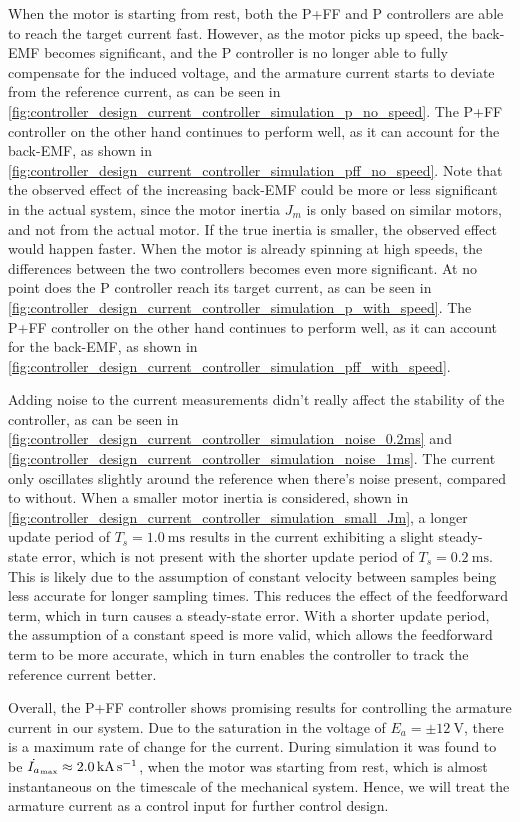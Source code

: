 When the motor is starting from rest, both the P+FF and P controllers are able to reach the target current fast. However, as the motor picks up speed, the back-EMF becomes significant, and the P controller is no longer able to fully compensate for the induced voltage, and the armature current starts to deviate from the reference current, as can be seen in \cref{fig:controller_design_current_controller_simulation_p_no_speed}. The P+FF controller on the other hand continues to perform well, as it can account for the back-EMF, as shown in \cref{fig:controller_design_current_controller_simulation_pff_no_speed}. Note that the observed effect of the increasing back-EMF could be more or less significant in the actual system, since the motor inertia $J_m$ is only based on similar motors, and not from the actual motor. If the true inertia is smaller, the observed effect would happen faster. When the motor is already spinning at high speeds, the differences between the two controllers becomes even more significant. At no point does the P controller reach its target current, as can be seen in \cref{fig:controller_design_current_controller_simulation_p_with_speed}. The P+FF controller on the other hand continues to perform well, as it can account for the back-EMF, as shown in \cref{fig:controller_design_current_controller_simulation_pff_with_speed}.

Adding noise to the current measurements didn't really affect the stability of the controller, as can be seen in \cref{fig:controller_design_current_controller_simulation_noise_0.2ms} and \cref{fig:controller_design_current_controller_simulation_noise_1ms}. The current only oscillates slightly around the reference when there's noise present, compared to without. When a smaller motor inertia is considered, shown in \cref{fig:controller_design_current_controller_simulation_small_Jm}, a longer update period of $T_s = \SI{1.0}{\milli\second}$ results in the current exhibiting a slight steady-state error, which is not present with the shorter update period of $T_s = \SI{0.2}{\milli\second}$. This is likely due to the assumption of constant velocity between samples being less accurate for longer sampling times. This reduces the effect of the feedforward term, which in turn causes a steady-state error. With a shorter update period, the assumption of a constant speed is more valid, which allows the feedforward term to be more accurate, which in turn enables the controller to track the reference current better. 

Overall, the P+FF controller shows promising results for controlling the armature current in our system. Due to the saturation in the voltage of $E_a=\pm\SI{12}{\volt}$, there is a maximum rate of change for the current. During simulation it was found to be $\dot{I_a}_{{\scriptscriptstyle\mathrm{\text{max}}}}\approx\SI{2.0}{\kilo\ampere\per\second}$, when the motor was starting from rest, which is almost instantaneous on the timescale of the mechanical system. Hence, we will treat the armature current as a control input for further control design.

